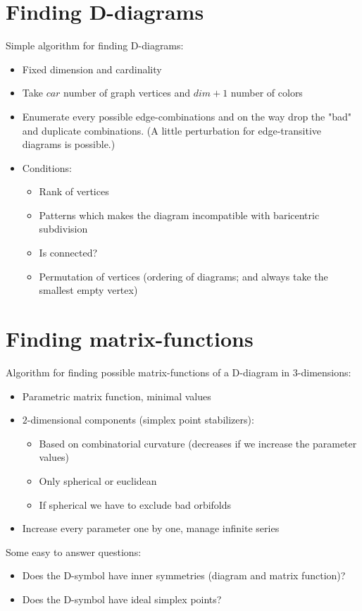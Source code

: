 \section{Finding D-diagrams}
\begin{frame}
  Simple algorithm for finding D-diagrams:
  \begin{itemize}
    \item Fixed dimension and cardinality
    \item Take $car$ number of graph vertices and $dim+1$ number of colors
    \item Enumerate every possible edge-combinations and on the way drop the
      "bad" and duplicate combinations. (A little perturbation for
      edge-transitive diagrams is possible.)
    \item Conditions:
      \begin{itemize}
	\item Rank of vertices
	\item Patterns which makes the diagram incompatible with baricentric
	  subdivision
	\item Is connected?
	\item Permutation of vertices (ordering of diagrams; and always take the
	  smallest empty vertex)
      \end{itemize}
  \end{itemize}
\end{frame}

\section{Finding matrix-functions}
\begin{frame}
  Algorithm for finding possible matrix-functions of a D-diagram in
  $3$-dimensions:
  \begin{itemize}
    \item Parametric matrix function, minimal values
    \item $2$-dimensional components (simplex point stabilizers):
      \begin{itemize}
	\item Based on combinatorial curvature (decreases if we increase the
	  parameter values)
	\item Only spherical or euclidean
	\item If spherical we have to exclude bad orbifolds
      \end{itemize}
    \item Increase every parameter one by one, manage infinite series
  \end{itemize}
  Some easy to answer questions:
  \begin{itemize}
    \item Does the D-symbol have inner symmetries (diagram and matrix function)?
    \item Does the D-symbol have ideal simplex points?
  \end{itemize}
\end{frame}


